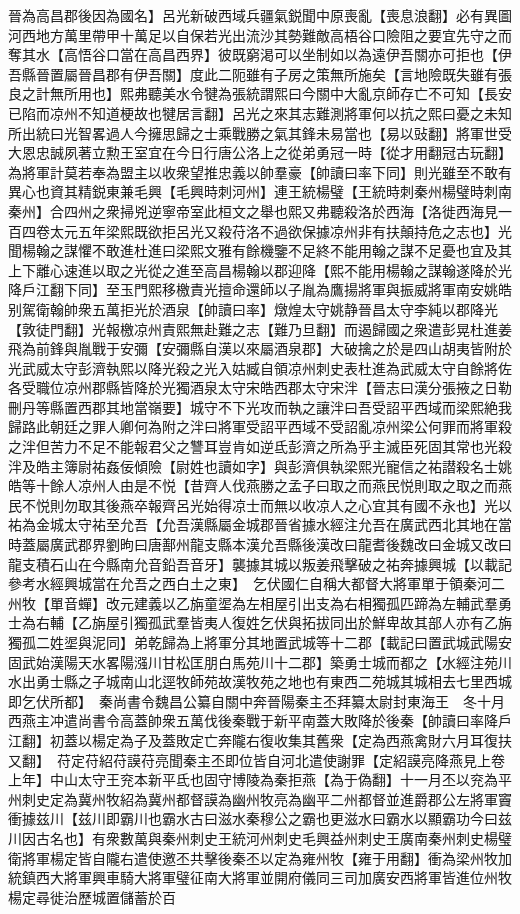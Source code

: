 晉為高昌郡後因為國名】呂光新破西域兵疆氣鋭聞中原喪亂【喪息浪翻】必有異圖河西地方萬里帶甲十萬足以自保若光出流沙其勢難敵高梧谷口險阻之要宜先守之而奪其水【高悟谷口當在高昌西界】彼既窮渇可以坐制如以為遠伊吾關亦可拒也【伊吾縣晉置屬晉昌郡有伊吾關】度此二阨雖有子房之策無所施矣【言地險既失雖有張良之計無所用也】熙弗聽美水令犍為張統謂熙曰今關中大亂京師存亡不可知【長安已陷而凉州不知道梗故也犍居言翻】呂光之來其志難測將軍何以抗之熙曰憂之未知所出統曰光智畧過人今擁思歸之士乘戰勝之氣其鋒未易當也【易以䜴翻】將軍世受大恩忠誠夙著立勲王室宜在今日行唐公洛上之從弟勇冠一時【從才用翻冠古玩翻】為將軍計莫若奉為盟主以收衆望推忠義以帥羣豪【帥讀曰率下同】則光雖至不敢有異心也資其精鋭東兼毛興【毛興時刺河州】連王統楊璧【王統時刺秦州楊璧時刺南秦州】合四州之衆掃兇逆寧帝室此桓文之舉也熙又弗聽殺洛於西海【洛徙西海見一百四卷太元五年梁熙既欲拒呂光又殺苻洛不過欲保據凉州非有扶顛持危之志也】光聞楊翰之謀懼不敢進杜進曰梁熙文雅有餘機鑒不足終不能用翰之謀不足憂也宜及其上下離心速進以取之光從之進至高昌楊翰以郡迎降【熙不能用楊翰之謀翰遂降於光降戶江翻下同】至玉門熙移檄責光擅命還師以子胤為鷹揚將軍與振威將軍南安姚皓别駕衛翰帥衆五萬拒光於酒泉【帥讀曰率】燉煌太守姚静晉昌太守李純以郡降光【敦徒門翻】光報檄凉州責熙無赴難之志【難乃旦翻】而遏歸國之衆遣彭晃杜進姜飛為前鋒與胤戰于安彌【安彌縣自漢以來屬酒泉郡】大破擒之於是四山胡夷皆附於光武威太守彭濟執熙以降光殺之光入姑臧自領凉州刺史表杜進為武威太守自餘將佐各受職位凉州郡縣皆降於光獨酒泉太守宋皓西郡太守宋泮【晉志曰漢分張掖之日勒刪丹等縣置西郡其地當嶺要】城守不下光攻而執之讓泮曰吾受詔平西域而梁熙絶我歸路此朝廷之罪人卿何為附之泮曰將軍受詔平西域不受詔亂凉州梁公何罪而將軍殺之泮但苦力不足不能報君父之讐耳豈肯如逆氐彭濟之所為乎主滅臣死固其常也光殺泮及皓主簿尉祐姦佞傾險【尉姓也讀如字】與彭濟俱執梁熙光寵信之祐譛殺名士姚皓等十餘人凉州人由是不悦【昔齊人伐燕勝之孟子曰取之而燕民悦則取之取之而燕民不悦則勿取其後燕卒報齊呂光始得凉士而無以收凉人之心宜其有國不永也】光以祐為金城太守祐至允吾【允吾漢縣屬金城郡晉省據水經注允吾在廣武西北其地在當時蓋屬廣武郡界劉昫曰唐鄯州龍支縣本漢允吾縣後漢改曰龍耆後魏改曰金城又改曰龍支積石山在今縣南允音鉛吾音牙】襲據其城以叛姜飛擊破之祐奔據興城【以載記參考水經興城當在允吾之西白土之東】　乞伏國仁自稱大都督大將軍單于領秦河二州牧【單音蟬】改元建義以乙旃童埿為左相屋引出支為右相獨孤匹蹄為左輔武羣勇士為右輔【乙旃屋引獨孤武羣皆夷人復姓乞伏與拓拔同出於鮮卑故其部人亦有乙旃獨孤二姓埿與泥同】弟乾歸為上將軍分其地置武城等十二郡【載記曰置武城武陽安固武始漢陽天水畧陽漒川甘松匡朋白馬苑川十二郡】築勇士城而都之【水經注苑川水出勇士縣之子城南山北逕牧師苑故漢牧苑之地也有東西二苑城其城相去七里西城即乞伏所都】　秦尚書令魏昌公纂自關中奔晉陽秦主丕拜纂太尉封東海王　冬十月西燕主冲遣尚書令高蓋帥衆五萬伐後秦戰于新平南蓋大敗降於後秦【帥讀曰率降戶江翻】初蓋以楊定為子及蓋敗定亡奔隴右復收集其舊衆【定為西燕禽財六月耳復扶又翻】　苻定苻紹苻謨苻亮聞秦主丕即位皆自河北遣使謝罪【定紹謨亮降燕見上卷上年】中山太守王兖本新平氐也固守博陵為秦拒燕【為于偽翻】十一月丕以兖為平州刺史定為冀州牧紹為冀州都督謨為幽州牧亮為幽平二州都督並進爵郡公左將軍竇衝據兹川【兹川即霸川也霸水古曰滋水秦穆公之霸也更滋水曰霸水以顯霸功今曰兹川因古名也】有衆數萬與秦州刺史王統河州刺史毛興益州刺史王廣南秦州刺史楊璧衛將軍楊定皆自隴右遣使邀丕共擊後秦丕以定為雍州牧【雍于用翻】衝為梁州牧加統鎮西大將軍興車騎大將軍璧征南大將軍並開府儀同三司加廣安西將軍皆進位州牧楊定尋徙治歷城置儲蓄於百